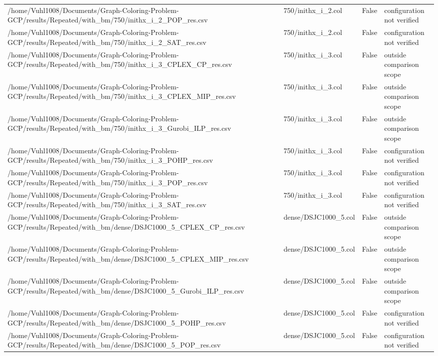 \begin{table}[htbp]
\begin{tabular}{llll}
/home/Vuhl1008/Documents/Graph-Coloring-Problem-GCP/results/Repeated/with\_bm/750/inithx\_i\_2\_POP\_res.csv & 750/inithx\_i\_2.col & False & configuration not verified \\
/home/Vuhl1008/Documents/Graph-Coloring-Problem-GCP/results/Repeated/with\_bm/750/inithx\_i\_2\_SAT\_res.csv & 750/inithx\_i\_2.col & False & configuration not verified \\
/home/Vuhl1008/Documents/Graph-Coloring-Problem-GCP/results/Repeated/with\_bm/750/inithx\_i\_3\_CPLEX\_CP\_res.csv & 750/inithx\_i\_3.col & False & outside comparison scope \\
/home/Vuhl1008/Documents/Graph-Coloring-Problem-GCP/results/Repeated/with\_bm/750/inithx\_i\_3\_CPLEX\_MIP\_res.csv & 750/inithx\_i\_3.col & False & outside comparison scope \\
/home/Vuhl1008/Documents/Graph-Coloring-Problem-GCP/results/Repeated/with\_bm/750/inithx\_i\_3\_Gurobi\_ILP\_res.csv & 750/inithx\_i\_3.col & False & outside comparison scope \\
/home/Vuhl1008/Documents/Graph-Coloring-Problem-GCP/results/Repeated/with\_bm/750/inithx\_i\_3\_POHP\_res.csv & 750/inithx\_i\_3.col & False & configuration not verified \\
/home/Vuhl1008/Documents/Graph-Coloring-Problem-GCP/results/Repeated/with\_bm/750/inithx\_i\_3\_POP\_res.csv & 750/inithx\_i\_3.col & False & configuration not verified \\
/home/Vuhl1008/Documents/Graph-Coloring-Problem-GCP/results/Repeated/with\_bm/750/inithx\_i\_3\_SAT\_res.csv & 750/inithx\_i\_3.col & False & configuration not verified \\
/home/Vuhl1008/Documents/Graph-Coloring-Problem-GCP/results/Repeated/with\_bm/dense/DSJC1000\_5\_CPLEX\_CP\_res.csv & dense/DSJC1000\_5.col & False & outside comparison scope \\
/home/Vuhl1008/Documents/Graph-Coloring-Problem-GCP/results/Repeated/with\_bm/dense/DSJC1000\_5\_CPLEX\_MIP\_res.csv & dense/DSJC1000\_5.col & False & outside comparison scope \\
/home/Vuhl1008/Documents/Graph-Coloring-Problem-GCP/results/Repeated/with\_bm/dense/DSJC1000\_5\_Gurobi\_ILP\_res.csv & dense/DSJC1000\_5.col & False & outside comparison scope \\
/home/Vuhl1008/Documents/Graph-Coloring-Problem-GCP/results/Repeated/with\_bm/dense/DSJC1000\_5\_POHP\_res.csv & dense/DSJC1000\_5.col & False & configuration not verified \\
/home/Vuhl1008/Documents/Graph-Coloring-Problem-GCP/results/Repeated/with\_bm/dense/DSJC1000\_5\_POP\_res.csv & dense/DSJC1000\_5.col & False & configuration not verified \\

\end{tabular}
\end{table}
